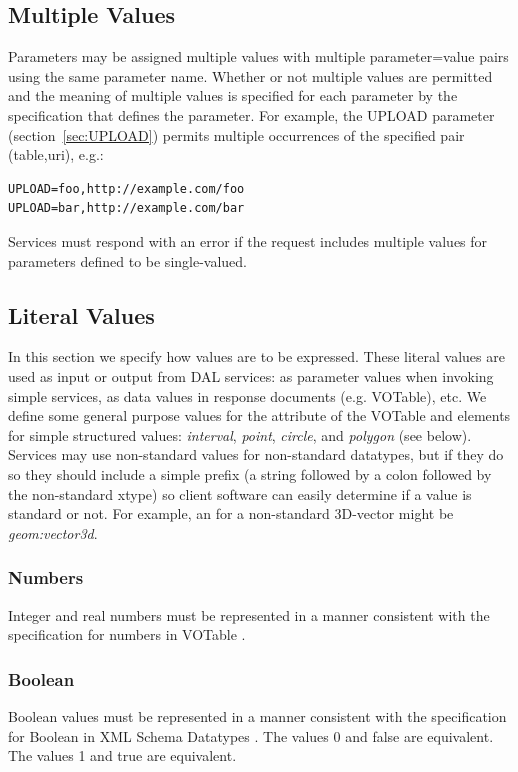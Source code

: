 \documentclass[11pt,letter]{ivoa}
\begin{document}
\subsection{Multiple Values}
Parameters may be assigned multiple values with multiple parameter=value pairs 
using the same parameter name. Whether or not multiple values are permitted and 
the meaning of multiple values is specified for each parameter by the 
specification that defines the parameter. For example, the UPLOAD parameter 
(section~\ref{sec:UPLOAD}) permits multiple occurrences of the specified 
pair (table,uri), e.g.:

\begin{verbatim}
UPLOAD=foo,http://example.com/foo
UPLOAD=bar,http://example.com/bar
\end{verbatim}

Services must respond with an error if the request includes multiple values for 
parameters defined to be single-valued.

\subsection{Literal Values}
In this section we specify how values are to be expressed. These literal values 
are used as input or output from DAL services: as parameter values when 
invoking simple services, as data values in response documents (e.g. VOTable), 
etc. We define some general purpose values for the  attribute of 
the VOTable  and  elements  for simple
structured values: \emph{interval}, 
\emph{point}, \emph{circle}, and \emph{polygon} (see below). Services may 
use non-standard  values for non-standard datatypes, but if they 
do so they should include a simple prefix (a string followed by a colon 
followed by the non-standard xtype) so client software can easily determine 
if a value is standard or not. For example, an  for a 
non-standard 3D-vector might be \emph{geom:vector3d}.

\subsubsection{Numbers}
Integer and real numbers must be represented in a manner consistent with the 
specification for numbers in VOTable \citep{std:VOTABLE}.

\subsubsection{Boolean}
Boolean values must be represented in a manner consistent with the 
specification 
for Boolean in XML Schema Datatypes \citep{std:XSD2}. The values 0 and false 
are equivalent. The values 1 and true are equivalent.  
\end{document}
